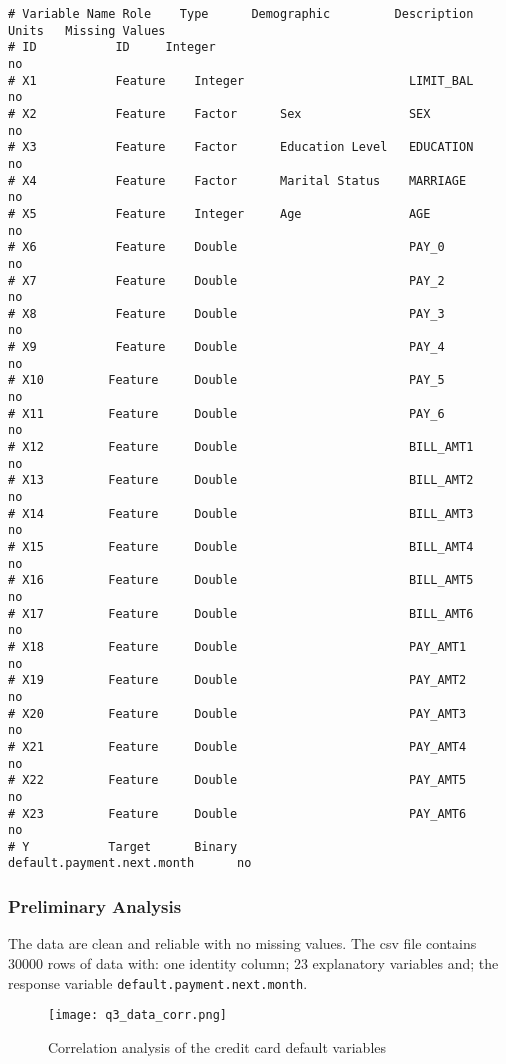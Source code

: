 \begin{verbatim}
# Variable Name Role	Type	  Demographic	      Description	Units	Missing Values
# ID           ID	  Integer				                              no
# X1	       Feature	  Integer		                LIMIT_BAL		      no
# X2	       Feature	  Factor	  Sex	            SEX		              no
# X3	       Feature	  Factor	  Education Level	EDUCATION		      no
# X4	       Feature	  Factor	  Marital Status	MARRIAGE		      no
# X5	       Feature	  Integer	  Age	            AGE		              no
# X6	       Feature	  Double		                PAY_0		          no
# X7	       Feature	  Double		                PAY_2		          no
# X8	       Feature	  Double		                PAY_3		          no
# X9	       Feature	  Double		                PAY_4		          no
# X10	      Feature	  Double		                PAY_5		          no
# X11	      Feature	  Double		                PAY_6		          no
# X12	      Feature	  Double		                BILL_AMT1		      no
# X13	      Feature	  Double		                BILL_AMT2		      no
# X14	      Feature	  Double		                BILL_AMT3		      no
# X15	      Feature	  Double		                BILL_AMT4		      no
# X16	      Feature	  Double		                BILL_AMT5		      no
# X17	      Feature	  Double		                BILL_AMT6		      no
# X18	      Feature	  Double		                PAY_AMT1		      no
# X19	      Feature	  Double		                PAY_AMT2		      no
# X20	      Feature	  Double		                PAY_AMT3		      no
# X21	      Feature	  Double		                PAY_AMT4		      no
# X22	      Feature	  Double		                PAY_AMT5		      no
# X23	      Feature	  Double		                PAY_AMT6		      no
# Y	          Target	  Binary		                default.payment.next.month		no
\end{verbatim}

\subsubsection{Preliminary Analysis}

The data are clean and reliable with no missing values.  The csv file contains 30000 rows of data with:
one identity column; 23 explanatory variables and; the response
variable \texttt{default.payment.next.month}.


\begin{figure}[H]
  \texttt{[image: q3\_data\_corr.png]}
  \caption{Correlation analysis of the credit card default variables}
\end{figure}

